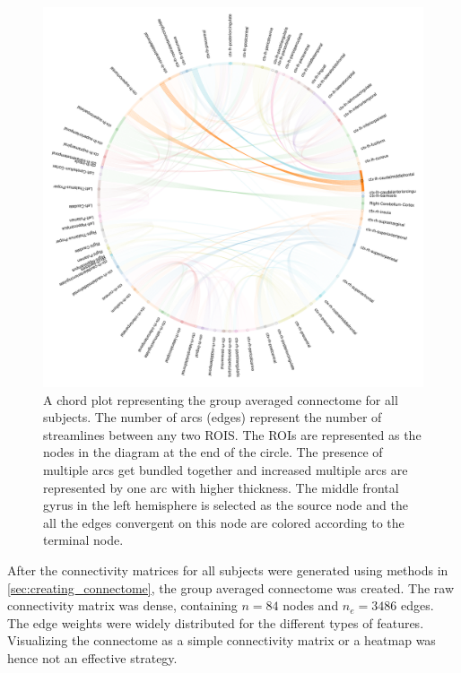 \documentclass[msthesis.tex]{subfiles}
\begin{document}
\begin{figure}
    \centering
    \includegraphics[width=\textwidth]{images/selected_view_all.png}
    \caption{A chord plot representing the group averaged connectome for all subjects. The number of arcs (edges) represent the number of streamlines between any two ROIS. The ROIs are represented as the nodes in the diagram at the end of the circle. The presence of multiple arcs get bundled together and increased multiple arcs are represented by one arc with higher thickness. The middle frontal gyrus in the left hemisphere is selected as the source node and the all the edges convergent on this node are colored according to the terminal node.}
    \label{fig:connectome_num_streamlines}
\end{figure}

After the connectivity matrices for all subjects were generated using methods in \autoref{sec:creating_connectome}, the group averaged connectome was created. The raw connectivity matrix was dense, containing $n = 84$ nodes and $n_e = 3486$ edges. The edge weights were widely distributed for the different types of features. Visualizing the connectome as a simple connectivity matrix or a heatmap was hence not an effective strategy.
\end{document}
